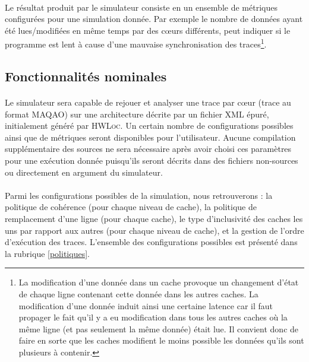 \paragraph{}
Le résultat produit par le simulateur consiste en un ensemble de métriques configurées pour une simulation donnée. Par exemple le nombre de données ayant été lues/modifiées en même temps par des c\oe urs différents, peut indiquer si le programme est lent à cause d'une mauvaise synchronisation des traces\footnote{La modification d'une donnée dans un cache provoque un changement d'état de chaque ligne contenant cette donnée dans les autres caches. La modification d'une donnée induit ainsi une certaine latence car il faut propager le fait qu'il y a eu modification dans tous les autres caches où la même ligne (et pas seulement la même donnée) était lue. Il convient donc de faire en sorte que les caches modifient le moins possible les données qu'ils sont plusieurs à contenir.}.

\subsection{Fonctionnalités nominales}

\paragraph{}
Le simulateur sera capable de rejouer et analyser une trace par c\oe ur (trace au format \textsc{MAQAO}) sur une architecture décrite par un fichier XML épuré, initialement généré par \textsc{HWLoc}. Un certain nombre de configurations possibles ainsi que de métriques seront disponibles pour l'utilisateur. Aucune compilation supplémentaire des sources ne sera nécessaire après avoir choisi ces paramètres pour une exécution donnée puisqu'ils seront décrits dans des fichiers non-sources ou directement en argument du simulateur. 

\paragraph{}
Parmi les configurations possibles de la simulation, nous retrouverons : la politique de cohérence (pour chaque niveau de cache), la politique de remplacement d'une ligne (pour chaque cache), le type d'inclusivité des caches les uns par rapport aux autres (pour chaque niveau de cache), et la gestion de l'ordre d'exécution des traces. L'ensemble des configurations possibles est présenté dans la rubrique \ref{politiques}.

